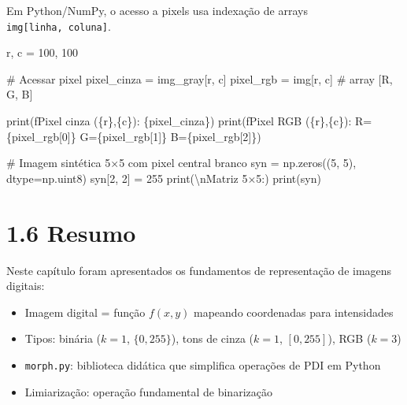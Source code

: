 \documentclass[
  portuguese,
  letterpaper,
  openany,
  oneside,
  12pt,
  a4paper]{book}
\newenvironment{Shaded}{\begin{snugshade}}{\end{snugshade}}
\newcommand{\BuiltInTok}[1]{\textcolor[rgb]{0.00,0.23,0.31}{#1}}
\newcommand{\CharTok}[1]{\textcolor[rgb]{0.13,0.47,0.30}{#1}}
\newcommand{\CommentTok}[1]{\textcolor[rgb]{0.37,0.37,0.37}{#1}}
\newcommand{\DecValTok}[1]{\textcolor[rgb]{0.68,0.00,0.00}{#1}}
\newcommand{\NormalTok}[1]{\textcolor[rgb]{0.00,0.23,0.31}{#1}}
\newcommand{\OperatorTok}[1]{\textcolor[rgb]{0.37,0.37,0.37}{#1}}
\newcommand{\SpecialCharTok}[1]{\textcolor[rgb]{0.37,0.37,0.37}{#1}}
\newcommand{\SpecialStringTok}[1]{\textcolor[rgb]{0.13,0.47,0.30}{#1}}
\newcommand{\StringTok}[1]{\textcolor[rgb]{0.13,0.47,0.30}{#1}}
\providecommand{\tightlist}{%
  \setlength{\itemsep}{0pt}\setlength{\parskip}{0pt}}
\begin{document}
\begin{tcolorbox}
Em Python/NumPy, o acesso a pixels usa indexação de arrays
\texttt{img{[}linha,\ coluna{]}}.

\begin{Shaded}
\begin{Highlighting}[]
\NormalTok{r, c }\OperatorTok{=} \DecValTok{100}\NormalTok{, }\DecValTok{100}

\CommentTok{\# Acessar pixel}
\NormalTok{pixel\_cinza }\OperatorTok{=}\NormalTok{ img\_gray[r, c]}
\NormalTok{pixel\_rgb   }\OperatorTok{=}\NormalTok{ img[r, c]       }\CommentTok{\# array [R, G, B]}

\BuiltInTok{print}\NormalTok{(}\SpecialStringTok{f\textquotesingle{}Pixel cinza (}\SpecialCharTok{\{}\NormalTok{r}\SpecialCharTok{\}}\SpecialStringTok{,}\SpecialCharTok{\{}\NormalTok{c}\SpecialCharTok{\}}\SpecialStringTok{): }\SpecialCharTok{\{}\NormalTok{pixel\_cinza}\SpecialCharTok{\}}\SpecialStringTok{\textquotesingle{}}\NormalTok{)}
\BuiltInTok{print}\NormalTok{(}\SpecialStringTok{f\textquotesingle{}Pixel RGB   (}\SpecialCharTok{\{}\NormalTok{r}\SpecialCharTok{\}}\SpecialStringTok{,}\SpecialCharTok{\{}\NormalTok{c}\SpecialCharTok{\}}\SpecialStringTok{): R=}\SpecialCharTok{\{}\NormalTok{pixel\_rgb[}\DecValTok{0}\NormalTok{]}\SpecialCharTok{\}}\SpecialStringTok{  G=}\SpecialCharTok{\{}\NormalTok{pixel\_rgb[}\DecValTok{1}\NormalTok{]}\SpecialCharTok{\}}\SpecialStringTok{  B=}\SpecialCharTok{\{}\NormalTok{pixel\_rgb[}\DecValTok{2}\NormalTok{]}\SpecialCharTok{\}}\SpecialStringTok{\textquotesingle{}}\NormalTok{)}

\CommentTok{\# Imagem sintética 5×5 com pixel central branco}
\NormalTok{syn }\OperatorTok{=}\NormalTok{ np.zeros((}\DecValTok{5}\NormalTok{, }\DecValTok{5}\NormalTok{), dtype}\OperatorTok{=}\NormalTok{np.uint8)}
\NormalTok{syn[}\DecValTok{2}\NormalTok{, }\DecValTok{2}\NormalTok{] }\OperatorTok{=} \DecValTok{255}
\BuiltInTok{print}\NormalTok{(}\StringTok{\textquotesingle{}}\CharTok{\textbackslash{}n}\StringTok{Matriz 5×5:\textquotesingle{}}\NormalTok{)}
\BuiltInTok{print}\NormalTok{(syn)}
\end{Highlighting}
\end{Shaded}

\section{1.6 Resumo}\label{resumo-1}

Neste capítulo foram apresentados os fundamentos de representação de
imagens digitais:

\begin{itemize}
\tightlist
\item
  Imagem digital = função \(f(x,y)\) mapeando coordenadas para
  intensidades
\item
  Tipos: binária (\(k=1\), \(\{0,255\}\)), tons de cinza (\(k=1\),
  \([0,255]\)), RGB (\(k=3\))
\item
  \texttt{morph.py}: biblioteca didática que simplifica operações de PDI
  em Python
\item
  Limiarização: operação fundamental de binarização
\end{itemize}


\end{tcolorbox}
\end{document}
